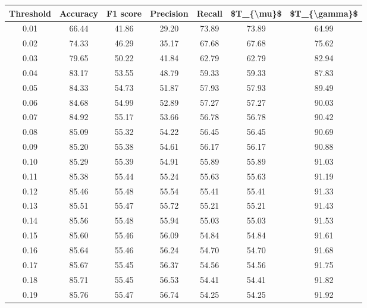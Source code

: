 \begin{tabular}{|c|c|c|c|c|c|c|}
\toprule
 Threshold &  Accuracy &  F1 score &  Precision &  Recall &  \$T\_\{\textbackslash mu\}\$ &  \$T\_\{\textbackslash gamma\}\$ \\
\hline
      0.01 &     66.44 &     41.86 &      29.20 &   73.89 &      73.89 &         64.99 \\
      0.02 &     74.33 &     46.29 &      35.17 &   67.68 &      67.68 &         75.62 \\
      0.03 &     79.65 &     50.22 &      41.84 &   62.79 &      62.79 &         82.94 \\
      0.04 &     83.17 &     53.55 &      48.79 &   59.33 &      59.33 &         87.83 \\
      0.05 &     84.33 &     54.73 &      51.87 &   57.93 &      57.93 &         89.49 \\
      0.06 &     84.68 &     54.99 &      52.89 &   57.27 &      57.27 &         90.03 \\
      0.07 &     84.92 &     55.17 &      53.66 &   56.78 &      56.78 &         90.42 \\
      0.08 &     85.09 &     55.32 &      54.22 &   56.45 &      56.45 &         90.69 \\
      0.09 &     85.20 &     55.38 &      54.61 &   56.17 &      56.17 &         90.88 \\
      0.10 &     85.29 &     55.39 &      54.91 &   55.89 &      55.89 &         91.03 \\
      0.11 &     85.38 &     55.44 &      55.24 &   55.63 &      55.63 &         91.19 \\
      0.12 &     85.46 &     55.48 &      55.54 &   55.41 &      55.41 &         91.33 \\
      0.13 &     85.51 &     55.47 &      55.72 &   55.21 &      55.21 &         91.43 \\
      0.14 &     85.56 &     55.48 &      55.94 &   55.03 &      55.03 &         91.53 \\
      0.15 &     85.60 &     55.46 &      56.09 &   54.84 &      54.84 &         91.61 \\
      0.16 &     85.64 &     55.46 &      56.24 &   54.70 &      54.70 &         91.68 \\
      0.17 &     85.67 &     55.45 &      56.37 &   54.56 &      54.56 &         91.75 \\
      0.18 &     85.71 &     55.45 &      56.53 &   54.41 &      54.41 &         91.82 \\
      0.19 &     85.76 &     55.47 &      56.74 &   54.25 &      54.25 &         91.92 \\

\end{tabular}
